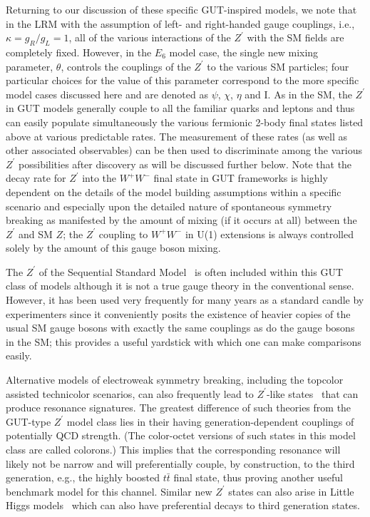 \documentclass[a4paper,11pt]{article}
\newcommand{\Zp}{\ensuremath{Z^{\prime}}}
\newcommand{\Z}{\ensuremath{Z}}
\begin{document}
Returning to our discussion of these specific GUT-inspired models, we note that in the LRM with the assumption of left- and right-handed gauge couplings, i.e., $\kappa=g_R/g_L=1$,
all of the various interactions of the $\Zp$ with the SM fields are completely fixed. However, in the $E_6$ model case, the
single new mixing parameter, $\theta$, controls the couplings of the $\Zp$ to the various SM particles; four particular choices for the value of this parameter correspond to the more
specific model cases discussed here and are denoted as $\psi$, $\chi$, $\eta$ and I. As in the SM, the $\Zp$ in GUT models generally couple to all the familiar quarks and leptons and
thus can easily populate simultaneously the various fermionic 2-body final states listed above at various predictable rates. The measurement of these rates (as well as other associated
observables) can be then used to discriminate among the various $\Zp$ possibilities after discovery as will be discussed further below. Note that the decay rate for $\Zp$ into the
$W^+W^-$ final state in GUT frameworks is highly dependent on the details of the model building assumptions within a specific scenario and especially upon the detailed nature
of spontaneous symmetry breaking as manifested by the amount of mixing (if it occurs at all) between the $\Zp$ and SM $\Z$; the $\Zp$ coupling to $W^+W^-$ in U(1) extensions is
always controlled solely by the amount of this gauge boson mixing.

The $\Zp$ of the Sequential Standard Model~\cite{Altarelli:1989ff} is often included within this GUT class of models although it is not a true gauge theory in the conventional sense.
However, it has been used very frequently for many years as a standard candle by experimenters since it conveniently posits the existence of heavier copies of the usual SM gauge bosons
with exactly the same couplings as do the gauge bosons in the SM; this provides a useful yardstick with which one can make comparisons easily.

Alternative models of electroweak symmetry breaking, including the topcolor assisted technicolor scenarios, can also frequently lead to $\Zp$-like states~\cite{Hill:1994hp}
that can produce resonance signatures. The greatest difference of such theories from the GUT-type $\Zp$ model class lies in their having generation-dependent couplings of
potentially QCD strength. (The color-octet versions of such states in this model class are called colorons.) This implies that the corresponding resonance will likely not be narrow and
will preferentially couple, by construction, to the
third generation, e.g., the highly boosted $t\bar t$ final state, thus proving another useful benchmark model for this channel. Similar new $\Zp$ states can also arise in Little Higgs
models~\cite{ArkaniHamed:2001nc} which can also have preferential decays to third generation states.
\end{document}
